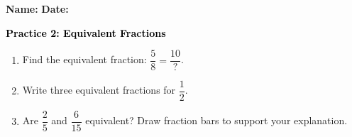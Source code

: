 \documentclass[12pt, letterpaper, fleqn]{article}
\begin{document}
\textbf{Name:} \underline{\hspace{5cm}}
\hfill
\textbf{Date:} \underline{\hspace{3cm}}\\

\begin{tcolorbox}[colback=customteal!20]
    \large\textcolor{black}{\textbf{Practice 2: Equivalent Fractions}}
\end{tcolorbox}
\begin{enumerate}[itemsep=3.5cm, leftmargin=0.6cm]
\item Find the equivalent fraction: $\dfrac{5}{8} = \dfrac{10}{\text{?}}$.
\vspace{3.5cm}
\item Write three equivalent fractions for $\dfrac{1}{2}$.
\vspace{3.5cm}
\item Are $\dfrac{2}{5}$ and $\dfrac{6}{15}$ equivalent? Draw fraction bars to support your explanation.
\end{enumerate}
\end{document}
